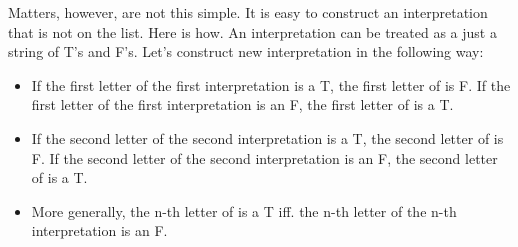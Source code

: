 Matters, however, are not this simple. It is easy to construct an interpretation 
that is not on the list. Here is how. An interpretation can be treated as a just 
a string of T's and F's. Let's construct new interpretation   in 
the following way:

\begin{itemize}
 \item If the first letter of the first interpretation is a T, the first letter of 
   is F. If the first letter of the first interpretation is an F, the first 
  letter of  is a T.

 \item If the second letter of the second interpretation is a T, the second letter of 
   is F. If the second letter of the second interpretation is an F, the 
  second letter of  is a T.

 \item More generally, the n-th letter of  is a T iff. the n-th 
  letter of the n-th interpretation is an F. 

\end{itemize}

